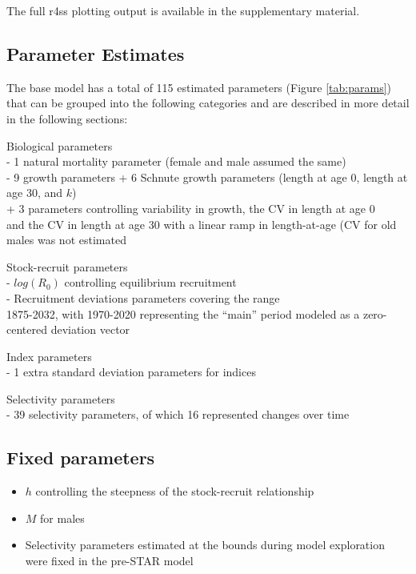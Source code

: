 \documentclass[
  english,
  a4paper,
]{article}
\providecommand{\tightlist}{%
  \setlength{\itemsep}{0pt}\setlength{\parskip}{0pt}}
\begin{document}
The full r4ss plotting output is available in the supplementary material.

\hypertarget{parameter-estimates}{%
\subsection{Parameter Estimates}\label{parameter-estimates}}

The base model has a total of 115 estimated parameters
(Figure \ref{tab:params}) that can be grouped into the following
categories and are described in more detail in the following sections:

Biological parameters\\
- 1 natural mortality parameter (female and male assumed the same)\\
- 9 growth parameters
+ 6 Schnute growth parameters (length at age 0, length at age 30, and \(k\))\\
+ 3 parameters controlling variability in growth, the CV in length at age 0\\
and the CV in length at age 30 with a linear ramp in length-at-age (CV for old males was not estimated

Stock-recruit parameters\\
- \(log(R_0)\) controlling equilibrium recruitment\\
- Recruitment deviations parameters covering the range\\
1875-2032, with
1970-2020
representing the ``main'' period modeled as a zero-centered deviation vector

Index parameters\\
- 1 extra standard deviation parameters
for indices

Selectivity parameters\\
- 39 selectivity parameters, of which
16 represented changes over time

\hypertarget{fixed-parameters}{%
\subsection{Fixed parameters}\label{fixed-parameters}}

\begin{itemize}
\tightlist
\item
  \(h\) controlling the steepness of the stock-recruit relationship
\item
  \(M\) for males
\item
  Selectivity parameters estimated at the bounds during model exploration were fixed in the pre-STAR model
\end{itemize}
\end{document}
